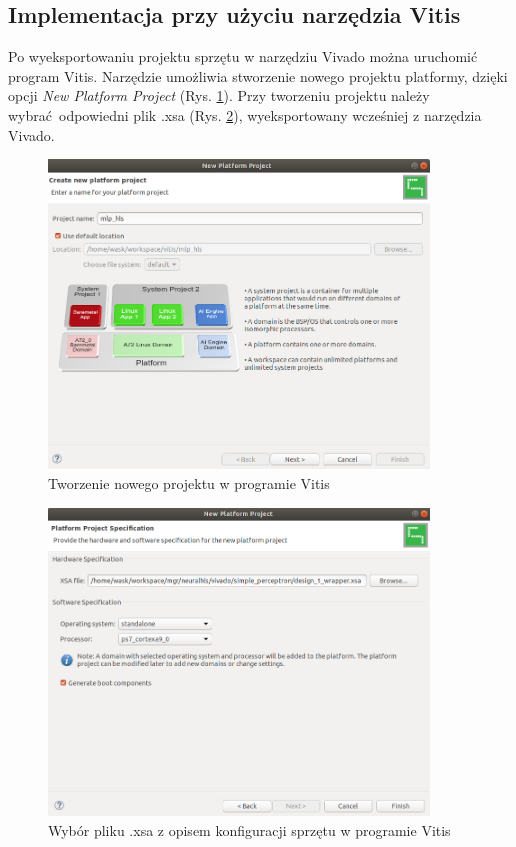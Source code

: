 \subsection{Implementacja przy użyciu narzędzia Vitis}

Po wyeksportowaniu projektu sprzętu w narzędziu Vivado można uruchomić program Vitis. Narzędzie umożliwia stworzenie 
nowego projektu platformy, dzięki opcji \emph{New Platform Project} (Rys. \ref{new-vitis-project1}). Przy tworzeniu 
projektu należy wybrać odpowiedni plik .xsa (Rys. \ref{new-vitis-project2}), wyeksportowany wcześniej z narzędzia 
Vivado. 

\begin{figure}[!h]
  \centering
  \includegraphics[width=0.9\textwidth]{img/new-vitis-project1.png}
  \caption{Tworzenie nowego projektu w programie Vitis}
  \label{new-vitis-project1}
\end{figure}


\begin{figure}[!h]
  \centering
  \includegraphics[width=0.9\textwidth]{img/new-vitis-project2.png}
  \caption{Wybór pliku .xsa z opisem konfiguracji sprzętu w programie Vitis}
  \label{new-vitis-project2}
\end{figure}

